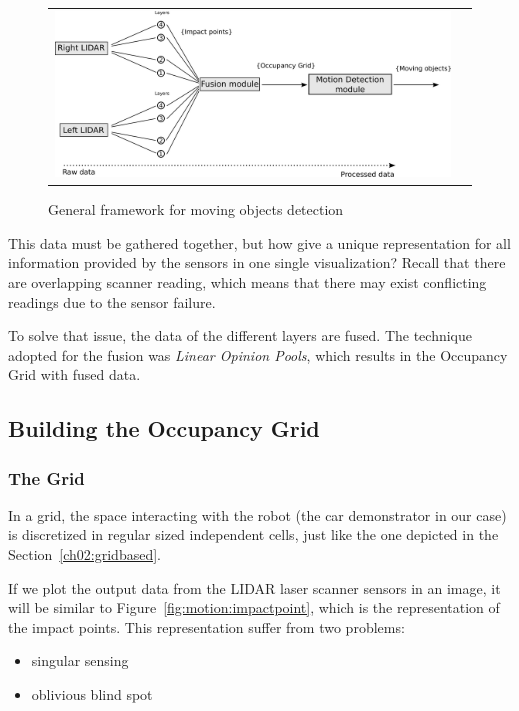 \begin{figure}[h]
   \centering
     \begin{tabular}{lr}
       \includegraphics[scale=0.30]{img/fig:motion:framework}
     \end{tabular}
   \caption{General framework for moving objects detection}
   \label{fig:motion:framework}
\end{figure}

This data must be gathered together, but how give a unique representation for all information provided by the sensors in one single visualization? Recall that there are overlapping scanner reading, which means that there may exist conflicting readings due to the sensor failure.

To solve that issue, the data of the different layers are fused. The technique adopted for the fusion was \textit{Linear Opinion Pools}, which results in the Occupancy Grid with fused data\cite{ADARVE-2012-671211}.

\subsection{Building the Occupancy Grid}


\subsubsection{The Grid}
\label{ch03:buildgrid:grid}

In a grid, the space interacting with the robot (the car demonstrator in our case) is discretized in regular sized independent cells, just like the one depicted in the Section~\ref{ch02:gridbased}.

If we plot the output data from the LIDAR laser scanner sensors in an image, it will be similar to Figure~\ref{fig:motion:impactpoint}, which is the representation of the impact points. This representation suffer from two problems:

\begin{itemize}
\item singular sensing
\item oblivious blind spot 
\end{itemize}

